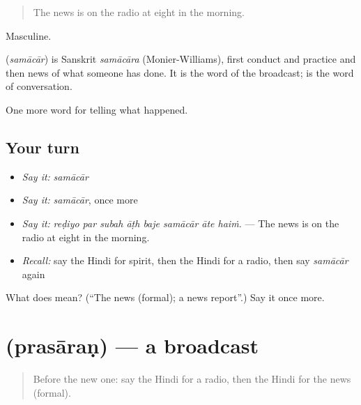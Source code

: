 \begin{quote}
The news is on the radio at eight in the morning.
\end{quote}

Masculine.

\begin{cousinweb}
\textbf{} (\emph{samācār}) is Sanskrit \emph{samācāra} (Monier-Williams), first conduct and practice and then news of what someone has done. It is the word of the broadcast; \textbf{} is the word of conversation.
\end{cousinweb}

\begin{grammarlens}[title={What you've built}]
One more word for telling what happened.
\end{grammarlens}

\subsection*{Your turn}
\begin{itemize}
\raggedright
  \item \emph{Say it:} \emph{samācār}
  \item \emph{Say it:} \emph{samācār}, once more
  \item \emph{Say it:} \emph{reḍiyo par subah āṭh baje samācār āte haiṁ.} — The news is on the radio at eight in the morning.
  \item \emph{Recall:} say the Hindi for spirit, then the Hindi for a radio, then say \emph{samācār} again
\end{itemize}

\begin{tcolorbox}[breakable,colback=teal!4,colframe=teal!35!black,title={Before you move on}]
What does  mean? (\textquotedblleft{}The news (formal); a news report\textquotedblright{}.) Say it once more.
\end{tcolorbox}
\section[\texorpdfstring{\hi{प्रसारण} (prasāraṇ)}{प्रसारण (prasāraṇ)}]{ (prasāraṇ) — a broadcast}

\label{lesson:HI-C312-prasaran}



\begin{quote}
Before the new one: say the Hindi for a radio, then the Hindi for the news (formal).
\end{quote}

